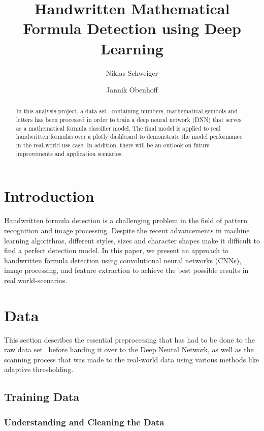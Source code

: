 \documentclass[@CLASSOPTIONS@]{tumarticle}
\title{Handwritten Mathematical Formula Detection using Deep Learning}
\author[affil={1}, email={niklas.schweiger@tum.de}]{Niklas Schweiger}
\author[affil={1}, email={jannik.obenhoff@tum.de}]{Jannik Obenhoff}
\affil{Department of Electrical and Computer Engineering, Technical
  University of Munich, Arcisstr. 21, 80333 Munich, Germany}
\begin{document}
\twocolumn

\maketitle
\begin{abstract}
  In this analysis project, a data set~\cite{kaggledataset} containing numbers, mathematical
  symbols and letters has been processed in order to train a deep neural network (DNN) that
  serves as a mathematical formula classifier model.
  The final model is applied to real handwritten formulas over a plotly dashboard to demonstrate the model
  performance in the real-world use case.
  In addition, there will be an outlook on future improvements and application scenarios.

\end{abstract}

\section{Introduction}

Handwritten formula detection is a challenging problem in the field of pattern recognition and
image processing.
Despite the recent advancements in machine learning algorithms, different styles, sizes and character
shapes make it difficult to find a perfect detection model.
In this paper, we present an approach to handwritten formula detection using convolutional
neural networks (CNNs), image processing, and feature extraction to achieve the best possible results
in real world-scenarios.

\section{Data}
\label{sec:measures}

This section describes the essential preprocessing that has had to be done to the raw
data set~\cite{kaggledataset} before handing it over to the Deep Neural Network,
as well as the scanning process that was made to the real-world data using
various methods like adaptive thresholding.

\subsection{Training Data}
\subsubsection{Understanding and Cleaning the Data}
\end{document}
